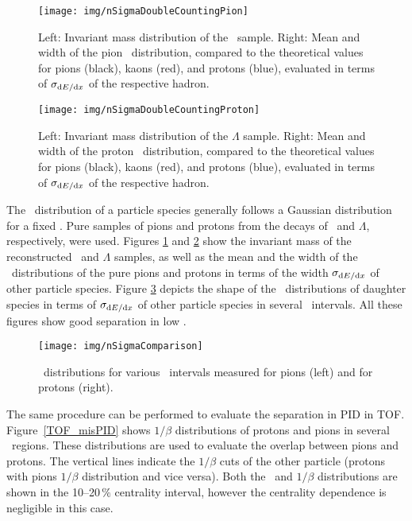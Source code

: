 \begin{figure}[!htb]
\centering
\texttt{[image: img/nSigmaDoubleCountingPion]}
\caption{\label{nSigmaDoublePion} Left: Invariant mass distribution of the \Kshort\ sample. Right: Mean and width of the pion \dedx\ distribution, compared to the theoretical values for pions (black), kaons (red), and protons (blue), evaluated in terms of $\sigma_{\mathrm{d} E / \mathrm{d} x}$ of the respective hadron.}
\end{figure}


\begin{figure}[!htb]
\centering
\texttt{[image: img/nSigmaDoubleCountingProton]}
\caption{\label{nSigmaDoubleProton} Left: Invariant mass distribution of the $\Lambda$ sample. Right: Mean and width of the proton \dedx\ distribution, compared to the theoretical values for pions (black), kaons (red), and protons (blue), evaluated in terms of $\sigma_{\mathrm{d} E / \mathrm{d} x}$ of the respective hadron.}
\end{figure}

The \dedx\ distribution of a particle species generally follows a Gaussian distribution for a fixed \pt\@. Pure samples of pions and protons from the decays of \Kshort\ and $\Lambda$, respectively, were used. Figures \ref{nSigmaDoublePion} and \ref{nSigmaDoubleProton} show the invariant mass of the reconstructed \Kshort\ and  $\Lambda$ samples, as well as the mean and the width of the \dedx\ distributions of the pure pions and protons in terms of the width $\sigma_{\mathrm{d} E / \mathrm{d} x}$ of other particle species. Figure \ref{nSigmaComparison} depicts the shape of the \dedx\ distributions of daughter species in terms of $\sigma_{\mathrm{d} E / \mathrm{d} x}$ of other particle species in several \pt\ intervals. All these figures show good separation in low \pt\@.

\begin{figure}[!htb]
\centering
\texttt{[image: img/nSigmaComparison]}
\caption{\label{nSigmaComparison} \dedx\ distributions for various \pt\ intervals measured for pions (left) and for protons (right).}
\end{figure}

The same procedure can be performed to evaluate the separation in PID in TOF\@. Figure~\ref{TOF_misPID} shows $1/\beta$ distributions of protons and pions in several \pt\ regions. These distributions are used to evaluate the overlap between pions and protons. The vertical lines indicate the $1/\beta$ cuts of the other particle (protons with pions $1/\beta$ distribution and vice versa)\@. Both the \dedx\ and $1/\beta$ distributions are shown in the 10--20$\,\%$ centrality interval, however the centrality dependence is negligible in this case. 

